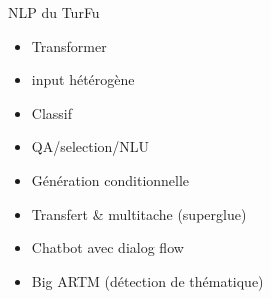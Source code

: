 \begin{frame}{NLP du TurFu}
    \begin{itemize}
    \item Transformer
    \item input hétérogène
    \item Classif
    \item QA/selection/NLU
    \item Génération conditionnelle
    \item Transfert & multitache (superglue)
    \item Chatbot avec dialog flow
    \item Big ARTM (détection de thématique)
    \end{itemize}
\end{frame}